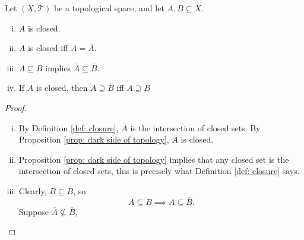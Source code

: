 \begin{proposition}
	\label{prop: properties of closures}
	Let $(X, \mathcal T)$ be a topological space, and let $A, B \subseteq X$.
	\begin{enumerate}[(i)]
		\item
		$\overline A$ is closed.
		
		\item
		$A$ is closed iff $A = \overline A$.
		
		\item
		$A \subseteq B$ implies $\overline A \subseteq \overline B$.
		
		\item
		If $A$ is closed, then $A \supseteq B$ iff $A \supseteq \overline B$
	\end{enumerate}
	
	\begin{proof} \
		\begin{enumerate}[(i)]
			\item
			By Definition \ref{def: closure}, $\overline A$ is the intersection of closed sets. By Proposition \ref{prop: dark side of topology}, $\overline A$ is closed.
			
			\item
			Proposition \ref{prop: dark side of topology} implies that any closed set is the intersection of closed sets, this is precisely what Definition \ref{def: closure} says.
			
			\item
			Clearly, $B \subseteq \overline B$, so
			$$
			A \subseteq B \implies A \subseteq \overline B.
			$$
			Suppose $\overline A \not \subseteq \overline B$,
		\end{enumerate}
	\end{proof}
\end{proposition}



